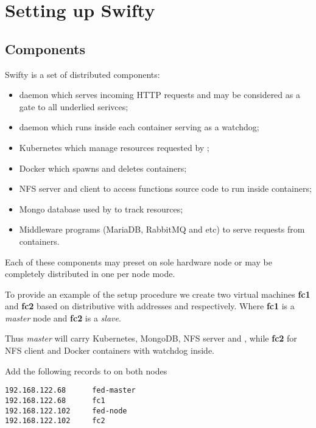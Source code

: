 \chapter{Setting up Swifty}
\label{ch:setup}

\section{Components}
\label{sec:setup-components}

Swifty is a set of distributed components:

\begin{itemize}
\item{ daemon which serves incoming HTTP requests and may
	be considered as a gate to all underlied serivces;}
\item{ daemon which runs inside each container serving as a watchdog;}
\item{Kubernetes which manage resources requested by ;}
\item{Docker which spawns and deletes containers;}
\item{NFS server and client to access functions source code
	to run inside containers;}
\item{Mongo database used by  to track resources;}
\item{Middleware programs (MariaDB, RabbitMQ and etc) to serve requests from
	containers.}
\end{itemize}

Each of these components may preset on sole hardware node or may be
completely distributed in one per node mode.

To provide an example of the setup procedure we create two virtual machines
\textbf{fc1} and \textbf{fc2} based on
 distributive
with addresses  and  respectively.
Where \textbf{fc1} is a \emph{master} node and \textbf{fc2} is a \emph{slave}.

Thus \emph{master} will carry Kubernetes, MongoDB, NFS server and ,
while \textbf{fc2} for NFS client and Docker containers with 
watchdog inside.

Add the following records to  on both nodes

\begin{lstlisting}
192.168.122.68		fed-master
192.168.122.68		fc1
192.168.122.102		fed-node
192.168.122.102		fc2
\end{lstlisting}

